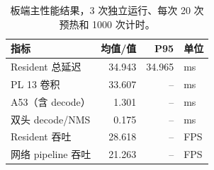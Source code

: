 \begin{table}[t]
\centering
\caption{板端主性能结果，3 次独立运行、每次 20 次预热和 1000 次计时。}
\label{tab:performance}
\small
\begin{tabular}{lrrl}
\toprule
指标 & 均值/值 & P95 & 单位 \\
\midrule
Resident 总延迟 & 34.943 & 34.965 & ms \\
PL 13 卷积 & 33.607 & -- & ms \\
A53（含 decode） & 1.301 & -- & ms \\
双头 decode/NMS & 0.175 & -- & ms \\
Resident 吞吐 & 28.618 & -- & FPS \\
网络 pipeline 吞吐 & 21.263 & -- & FPS \\
\bottomrule
\end{tabular}
\end{table}
